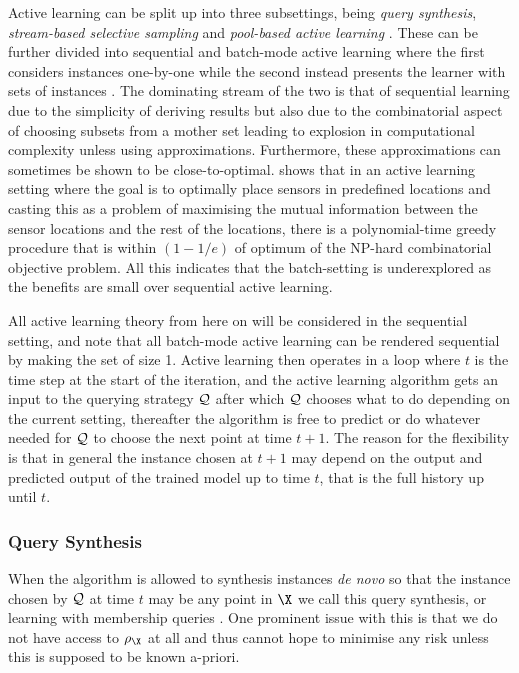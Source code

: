 Active learning can be split up into three subsettings, being \emph{query
synthesis}, \emph{stream-based selective sampling} and \emph{pool-based active
learning} \citep{settles12_activ_learn}. These can be further divided into
sequential and batch-mode active learning where the first considers instances
one-by-one while the second instead presents the learner with sets of instances
\citep{guo08_discr}. The dominating stream of the two is that of sequential
learning due to the simplicity of deriving results but also due to the
combinatorial aspect of choosing subsets from a mother set leading to explosion
in computational complexity unless using approximations. Furthermore, these
approximations can sometimes be shown to be close-to-optimal.
\citep{krause08_near_optim_sensor_placem_gauss_proces} shows that in an active
learning setting where the goal is to optimally place sensors in predefined
locations and casting this as a problem of maximising the mutual information
between the sensor locations and the rest of the locations, there is a
polynomial-time greedy procedure that is within \((1 - 1/e)\) of optimum of the
NP-hard combinatorial objective problem. All this indicates that the
batch-setting is underexplored as the benefits are small over sequential active
learning.

All active learning theory from here on will be considered in the sequential
setting, and note that all batch-mode active learning can be rendered sequential
by making the set of size 1. Active learning then operates in a loop where \(t\)
is the time step at the start of the iteration, and the active learning
algorithm gets an input to the querying strategy \(\mathcal{Q}\) after which
\(\mathcal{Q}\) chooses what to do depending on the current setting, thereafter
the algorithm is free to predict or do whatever needed for \(\mathcal{Q}\) to
choose the next point at time \(t+1\). The reason for the flexibility is that in
general the instance chosen at \(t+1\) may depend on the output and predicted
output of the trained model up to time \(t\), that is the full history up until \(t\).

\subsubsection{Query Synthesis} When the algorithm is allowed to synthesis
instances \emph{de novo} so that the instance chosen by \(\mathcal{Q}\) at time
\(t\) may be any point in \(\X\) we call this query synthesis, or learning with
membership queries \citep{angluin88_queries_concep_learn}. One prominent issue
with this is that we do not have access to \(\rho_{\X}\) at all and thus cannot
hope to minimise any risk unless this is supposed to be known a-priori.


